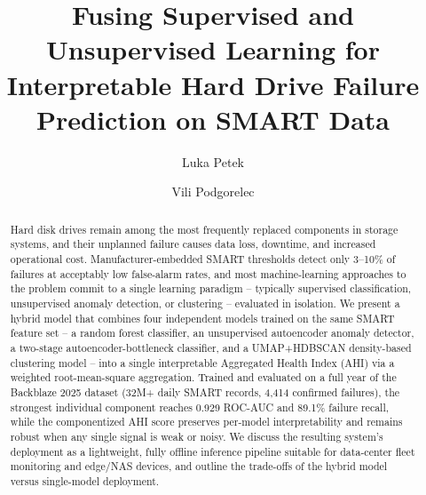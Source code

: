 \documentclass[sigconf,natbib=false, language=english]{acmart}
\begin{document}
\title[Fusing Supervised and Unsupervised Learning for Hard Drive Failure Prediction]{Fusing Supervised and Unsupervised Learning for Interpretable Hard Drive Failure Prediction on SMART Data}

\author{Luka Petek}

\author{Vili Podgorelec}

\renewcommand{\shortauthors}{Petek and Podgorelec}

\begin{abstract}
Hard disk drives remain among the most frequently replaced components in storage systems, and their unplanned failure causes data loss, downtime, and increased operational cost. Manufacturer-embedded SMART thresholds detect only 3--10\% of failures at acceptably low false-alarm rates, and most machine-learning approaches to the problem commit to a single learning paradigm -- typically supervised classification, unsupervised anomaly detection, or clustering -- evaluated in isolation. We present a hybrid model that combines four independent models trained on the same SMART feature set -- a random forest classifier, an unsupervised autoencoder anomaly detector, a two-stage autoencoder-bottleneck classifier, and a UMAP+HDBSCAN density-based clustering model -- into a single interpretable Aggregated Health Index (AHI) via a weighted root-mean-square aggregation. Trained and evaluated on a full year of the Backblaze 2025 dataset (32M+ daily SMART records, 4,414 confirmed failures), the strongest individual component reaches 0.929 ROC-AUC and 89.1\% failure recall, while the componentized AHI score preserves per-model interpretability and remains robust when any single signal is weak or noisy. We discuss the resulting system's deployment as a lightweight, fully offline inference pipeline suitable for data-center fleet monitoring and edge/NAS devices, and outline the trade-offs of the hybrid model versus single-model deployment.
\end{abstract}

\end{document}
